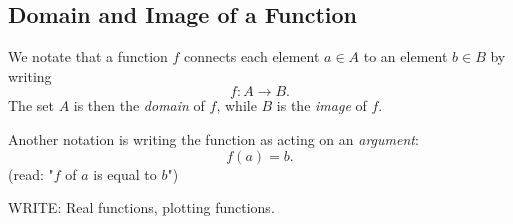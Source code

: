 \subsection{Domain and Image of a Function}
We notate that a function $f$ connects each element $a\in A$ to an element $b\in B$ by writing 
\begin{equation*}
  f:A\to B.
\end{equation*}
The set $A$ is then the \emph{domain} of $f$, while $B$ is the \emph{image} of $f$.

Another notation is writing the function as acting on an \emph{argument}:
\begin{equation*}
  f(a) = b.
\end{equation*}
(read: "$f$ of $a$ is equal to $b$")

WRITE: Real functions, plotting functions.

